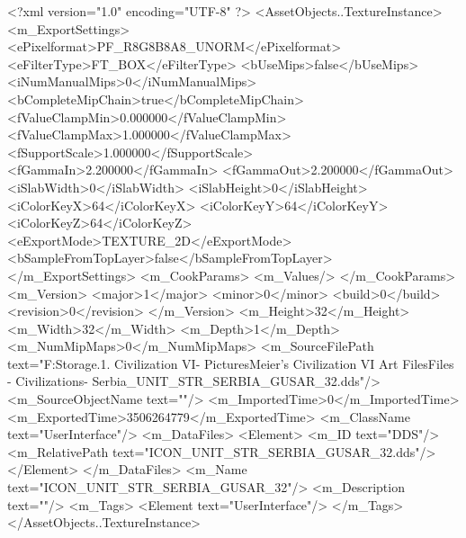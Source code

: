 <?xml version="1.0" encoding="UTF-8" ?>
<AssetObjects..TextureInstance>
	<m_ExportSettings>
		<ePixelformat>PF_R8G8B8A8_UNORM</ePixelformat>
		<eFilterType>FT_BOX</eFilterType>
		<bUseMips>false</bUseMips>
		<iNumManualMips>0</iNumManualMips>
		<bCompleteMipChain>true</bCompleteMipChain>
		<fValueClampMin>0.000000</fValueClampMin>
		<fValueClampMax>1.000000</fValueClampMax>
		<fSupportScale>1.000000</fSupportScale>
		<fGammaIn>2.200000</fGammaIn>
		<fGammaOut>2.200000</fGammaOut>
		<iSlabWidth>0</iSlabWidth>
		<iSlabHeight>0</iSlabHeight>
		<iColorKeyX>64</iColorKeyX>
		<iColorKeyY>64</iColorKeyY>
		<iColorKeyZ>64</iColorKeyZ>
		<eExportMode>TEXTURE_2D</eExportMode>
		<bSampleFromTopLayer>false</bSampleFromTopLayer>
	</m_ExportSettings>
	<m_CookParams>
		<m_Values/>
	</m_CookParams>
	<m_Version>
		<major>1</major>
		<minor>0</minor>
		<build>0</build>
		<revision>0</revision>
	</m_Version>
	<m_Height>32</m_Height>
	<m_Width>32</m_Width>
	<m_Depth>1</m_Depth>
	<m_NumMipMaps>0</m_NumMipMaps>
	<m_SourceFilePath text="F:\Mod Storage\2.1. Civilization VI\Mods\Archive - Pictures\Sid Meier's Civilization VI Art Files\Art Files - Civilizations\Civilization - Serbia\ICON_UNIT_STR_SERBIA_GUSAR_32.dds"/>
	<m_SourceObjectName text=""/>
	<m_ImportedTime>0</m_ImportedTime>
	<m_ExportedTime>3506264779</m_ExportedTime>
	<m_ClassName text="UserInterface"/>
	<m_DataFiles>
		<Element>
			<m_ID text="DDS"/>
			<m_RelativePath text="ICON_UNIT_STR_SERBIA_GUSAR_32.dds"/>
		</Element>
	</m_DataFiles>
	<m_Name text="ICON_UNIT_STR_SERBIA_GUSAR_32"/>
	<m_Description text=""/>
	<m_Tags>
		<Element text="UserInterface"/>
	</m_Tags>
</AssetObjects..TextureInstance>


